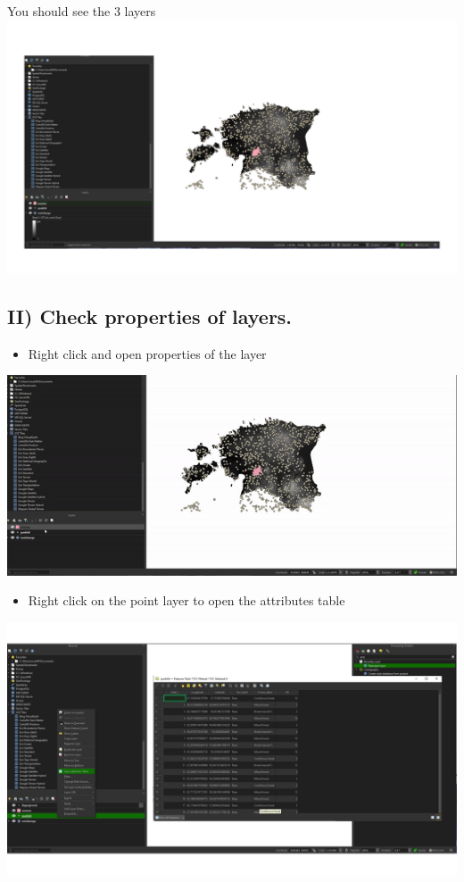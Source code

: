 \documentclass[
  letterpaper,
  DIV=11,
  numbers=noendperiod]{scrartcl}
\providecommand{\tightlist}{%
  \setlength{\itemsep}{0pt}\setlength{\parskip}{0pt}}\usepackage{longtable,booktabs,array}
\begin{document}
You should see the 3 layers \includegraphics{Lab1/qgis_ss/QGIS_ss7.png}

\hypertarget{ii-check-properties-of-layers.}{%
\subsection{II) Check properties of
layers.}\label{ii-check-properties-of-layers.}}

\begin{itemize}
\tightlist
\item
  Right click and open properties of the layer
\end{itemize}

\includegraphics{Lab1/qgis_ss/gif_2.gif}

\begin{itemize}
\tightlist
\item
  Right click on the point layer to open the attributes table
\end{itemize}

\includegraphics{Lab1/qgis_ss/QGIS_ss10.png}
\end{document}
